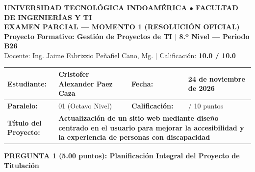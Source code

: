 \documentclass[10pt,a4paper]{article}
\begin{document}
\begin{tcolorbox}[colback=utiNavy, colframe=utiNavy, arc=4pt, colupper=white, boxrule=0pt, left=8pt, right=8pt, top=6pt, bottom=6pt]
\begin{center}
    {\scriptsize\textbf{\color{utiLightBlue}UNIVERSIDAD TECNOLÓGICA INDOAMÉRICA \quad $\bullet$ \quad FACULTAD DE INGENIERÍAS Y TI}}\\[2pt]
    {\large\textbf{\color{white}EXAMEN PARCIAL --- MOMENTO 1 (RESOLUCIÓN OFICIAL)}}\\[2pt]
    {\footnotesize\textbf{\color{utiLightBlue}Proyecto Formativo: Gestión de Proyectos de TI \quad $\vert$ \quad 8.º Nivel --- Periodo B26}}\\[2pt]
    {\scriptsize\color{white}Docente: Ing. Jaime Fabrizzio Peñafiel Cano, Mg. \quad $\vert$ \quad Calificación: \textbf{10.0 / 10.0}}
\end{center}
\end{tcolorbox}

\vspace{0.1cm}

\noindent
\begin{tabularx}{\textwidth}{|l X|l X|}
\hline
\textbf{Estudiante:} & Cristofer Alexander Paez Caza & \textbf{Fecha:} & 24 de noviembre de 2026 \\
\hline
\textbf{Paralelo:} & 01 (Octavo Nivel) & \textbf{Calificación:} & \phantom{XX} / 10 puntos \\
\hline
\textbf{Título del Proyecto:} & \multicolumn{3}{X|}{\textbf{Actualización de un sitio web mediante diseño centrado en el usuario para mejorar la accesibilidad y la experiencia de personas con discapacidad}} \\
\hline
\end{tabularx}

\vspace{0.3cm}

\begin{tcolorbox}[colback=utiLightBlue, colframe=utiBlue, arc=3pt, left=6pt, right=6pt, top=4pt, bottom=4pt]
\textbf{\color{utiNavy}PREGUNTA 1 (5.00 puntos): Planificación Integral del Proyecto de Titulación}
\end{tcolorbox}
\end{document}
